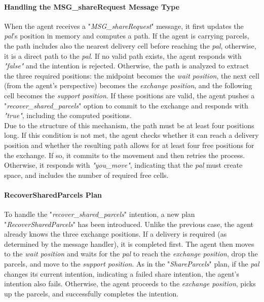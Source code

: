                 
                \paragraph{Handling the MSG\_shareRequest Message Type}
                    When the agent receives a "\textit{MSG\_shareRequest}" message, it first updates the \textit{pal}'s position in memory and computes a path. If the agent is carrying parcels, the path includes also the nearest delivery cell before reaching the \textit{pal}, otherwise, it is a direct path to the \textit{pal}. If no valid path exists, the agent responds with \textit{"false"} and the intention is rejected. Otherwise, the path is analyzed to extract the three required positions: the midpoint becomes the \textit{wait position}, the next cell (from the agent's perspective) becomes the \textit{exchange position}, and the following cell becomes the \textit{support position}. If these positions are valid, the agent pushes a "\textit{recover\_shared\_parcels}" option to commit to the exchange and responds with \textit{"true"}, including the computed positions.
                    \medskip\\
                    Due to the structure of this mechanism, the path must be at least four positions long. If this condition is not met, the agent checks whether it can reach a delivery position and whether the resulting path allows for at least four free positions for the exchange. If so, it commits to the movement and then retries the process. Otherwise, it responds with \textit{"you\_move"}, indicating that the \textit{pal} must create space, and includes the number of required free cells.
                    
                \paragraph{RecoverSharedParcels Plan}
                    To handle the "\textit{recover\_shared\_parcels}" intention, a new plan "\textit{RecoverSharedParcels}" has been introduced. Unlike the previous case, the agent already knows the three exchange positions. If a delivery is required (as determined by the message handler), it is completed first. The agent then moves to the \textit{wait position} and waits for the \textit{pal} to reach the \textit{exchange position}, drop the parcels, and move to the \textit{support position}. As in the "\textit{ShareParcels}" plan, if the \textit{pal} changes its current intention, indicating a failed share intention, the agent's intention also fails. Otherwise, the agent proceeds to the \textit{exchange position}, picks up the parcels, and successfully completes the intention.

